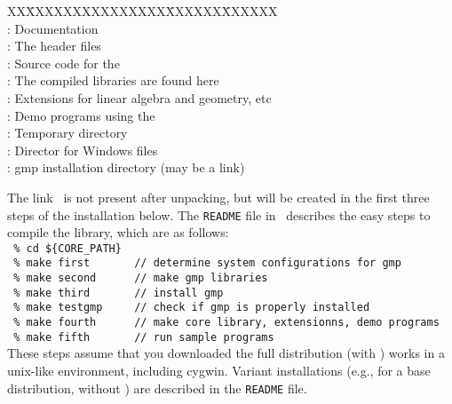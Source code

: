 \documentclass[12pt]{article}
\begin{document}
\begin{tabbing}
XX\=XXXXXXXXXXXXXXX\=XXXXXX\=XXXXXX \kill\\
	\> \docdir: \> Documentation\\
	\> : \> The header files\\
	\> \srcdir: \> Source code for the \corelib\\
	\> \libdir: \> The compiled libraries are found here\\
	\> \extdir: \> Extensions for linear algebra and geometry, etc\\
	\> \examplesdir: \> Demo programs using the \corelib \\ 
	\> \tempdir: \> Temporary directory \\ 
	\> \win: \> Director for Windows files \\ 
	\> \gmplink: \> gmp installation directory (may be a link)\\ 
\end{tabbing}
\noindent
The link \gmplink\ is not present after unpacking, but will be created
in the first three steps of the installation below.
The {\tt README} file in \corepath\ describes
the easy steps to compile the library, which are as follows:
\\
\hspace*{1in} \verb+ % cd ${CORE_PATH} +
\\
\hspace*{1in} \verb+ % make first       // determine system configurations for gmp+
\\
\hspace*{1in} \verb+ % make second      // make gmp libraries+
\\
\hspace*{1in} \verb+ % make third       // install gmp +
\\
\hspace*{1in} \verb+ % make testgmp     // check if gmp is properly installed +
\\
\hspace*{1in} \verb+ % make fourth      // make core library, extensionns, demo programs +
\\
\hspace*{1in} \verb+ % make fifth       // run sample programs +
\\
These steps assume that you downloaded the
full distribution (with \gmp) works in a unix-like environment,
including cygwin.  Variant installations
(e.g., for a base distribution, without \gmp)
are described in the {\tt README} file.
\end{document}
